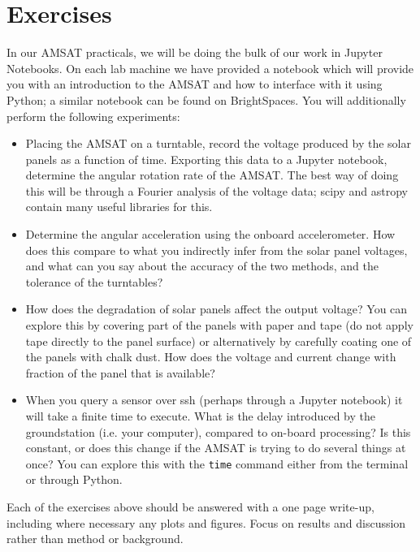 \documentclass{tufte-book}
\begin{document}
\section{Exercises}

In our AMSAT practicals, we will be doing the bulk of our work in Jupyter Notebooks. On each lab machine we have provided a notebook which will provide you with an introduction to the AMSAT and how to interface with it using Python; a similar notebook can be found on BrightSpaces. You will additionally perform the following experiments:

\begin{tcolorbox}[sharp corners=all, colback=white!75!green]
\begin{itemize}   
\item Placing the AMSAT on a turntable, record the voltage produced by the solar panels as a function of time. Exporting this data to a Jupyter notebook, determine the angular rotation rate of the AMSAT. The best way of doing this will be through a Fourier analysis of the voltage data; scipy and astropy contain many useful libraries for this.
\item Determine the angular acceleration using the onboard accelerometer. How does this compare to what you indirectly infer from the solar panel voltages, and what can you say about the accuracy of the two methods, and the tolerance of the turntables?
\item How does the degradation of solar panels affect the output voltage? You can explore this by covering part of the panels with paper and tape (do not apply tape directly to the panel surface) or alternatively by carefully coating one of the panels with chalk dust. How does the voltage and current change with fraction of the panel that is available?
\item When you query a sensor over ssh (perhaps through a Jupyter notebook) it will take a finite time to execute. What is the delay introduced by the groundstation (i.e. your computer), compared to on-board processing? Is this constant, or does this change if the AMSAT is trying to do several things at once? You can explore this with the \verb|time| command either from the terminal or through Python.
\end{itemize}

\end{tcolorbox} 


Each of the exercises above should be answered with a one page write-up, including where necessary any plots and figures. Focus on results and discussion rather than method or background.
\end{document}
